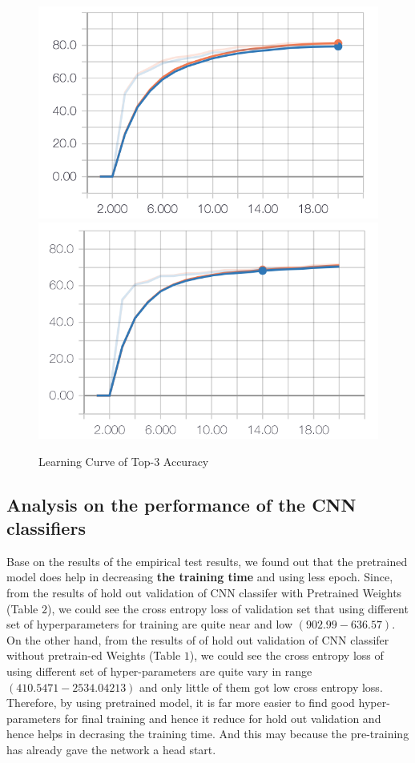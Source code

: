 \documentclass{article}
\begin{document}
\begin{figure}[h]
  \centering
  \includegraphics[scale=0.7]{top_3_acc_sc.png}
  \includegraphics[scale=0.7]{top_3_acc_pre.png}
  \caption{Learning Curve of Top-3 Accuracy}
\end{figure}


\subsection{Analysis on the performance of the CNN classifiers}

Base on the results of the empirical test results, we found out that the pretrained model does help in decreasing \textbf{the training time} and using less epoch. Since, from the results of hold out validation of CNN classifer with Pretrained Weights (Table $2$), we could see the cross entropy loss of validation set that using different set of hyperparameters for training are quite near and low $(902.99-636.57)$. On the other hand, from the results of of hold out validation of CNN classifer without pretrain-ed Weights (Table $1$), we could see the cross entropy loss of using different set of hyper-parameters are quite vary in range $(410.5471-2534.04213)$ and only little of them got low cross entropy loss. Therefore, by using pretrained model, it is far more easier to find good hyper-parameters for final training and hence it reduce for hold out validation and hence helps in decrasing the training time. And this may because the pre-training has already gave the network a head start.
\end{document}
